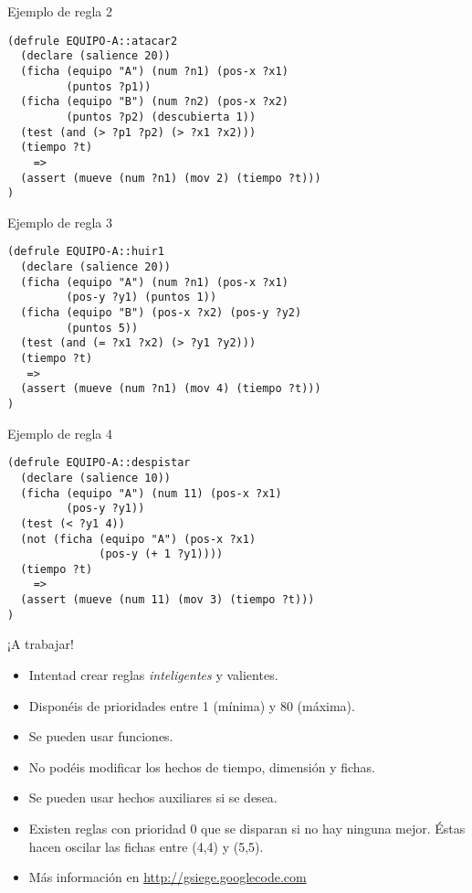 \documentclass[smaller,spanish,xcolor=svgnames]{beamer}
\begin{document}
\begin{frame}[fragile]{Ejemplo de regla 2}
\begin{verbatim}
(defrule EQUIPO-A::atacar2
  (declare (salience 20))
  (ficha (equipo "A") (num ?n1) (pos-x ?x1)
         (puntos ?p1))
  (ficha (equipo "B") (num ?n2) (pos-x ?x2)
         (puntos ?p2) (descubierta 1))
  (test (and (> ?p1 ?p2) (> ?x1 ?x2)))
  (tiempo ?t)
    =>
  (assert (mueve (num ?n1) (mov 2) (tiempo ?t)))
)
\end{verbatim}
\end{frame}

\begin{frame}[fragile]{Ejemplo de regla 3}
\begin{verbatim}
(defrule EQUIPO-A::huir1
  (declare (salience 20))
  (ficha (equipo "A") (num ?n1) (pos-x ?x1)
         (pos-y ?y1) (puntos 1))
  (ficha (equipo "B") (pos-x ?x2) (pos-y ?y2)
         (puntos 5))
  (test (and (= ?x1 ?x2) (> ?y1 ?y2)))
  (tiempo ?t)
   =>
  (assert (mueve (num ?n1) (mov 4) (tiempo ?t)))
)
\end{verbatim}
\end{frame}

\begin{frame}[fragile]{Ejemplo de regla 4}
\begin{verbatim}
(defrule EQUIPO-A::despistar
  (declare (salience 10))
  (ficha (equipo "A") (num 11) (pos-x ?x1)
         (pos-y ?y1))
  (test (< ?y1 4))
  (not (ficha (equipo "A") (pos-x ?x1)
              (pos-y (+ 1 ?y1))))
  (tiempo ?t)
    =>
  (assert (mueve (num 11) (mov 3) (tiempo ?t)))
)
\end{verbatim}
\end{frame}

\begin{frame}{¡A trabajar!}
  \begin{itemize}
  \item Intentad crear reglas \textit{inteligentes} y valientes.
  \item Disponéis de prioridades entre 1 (mínima) y 80 (máxima).
  \item Se pueden usar funciones.
  \item No podéis modificar los hechos de tiempo, dimensión y fichas.
  \item Se pueden usar hechos auxiliares si se desea.
  \item Existen reglas con prioridad 0 que se disparan si no hay ninguna
    mejor. Éstas hacen oscilar las fichas entre (4,4) y (5,5).
  \item Más información en \url{http://gsiege.googlecode.com}
  \end{itemize}
\end{frame}
\end{document}
